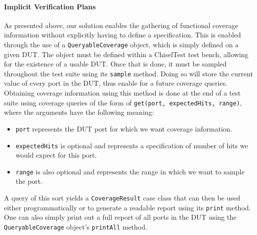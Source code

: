 \documentclass[conference]{IEEEtran}
\begin{document}
\paragraph{Implicit Verification Plans} As presented above, our solution enables the gathering of functional coverage information without explicitly having to define a specification.
This is enabled through the use of a \texttt{QueryableCoverage} object, which is simply defined on a given DUT.
The object must be defined within a ChiselTest test bench, allowing for the existence of a usable DUT.
Once that is done, it must be sampled throughout the test suite using its \texttt{sample} method.
Doing so will store the current value of every port in the DUT, thus enable for a future coverage queries.
Obtaining coverage information using this method is done at the end of a test suite using coverage queries of the form of \texttt{get(port, expectedHits, range)}, where the arguments have the following meaning:
\begin{itemize}
	\item \texttt{port} represents the DUT port for which we want coverage information.
	\item \texttt{expectedHits} is optional and represents a specification of number of hits we would expect for this port.
	\item \texttt{range} is also optional and represents the range in which we want to sample the port.
\end{itemize}
A query of this sort yields a \texttt{CoverageResult} case class that can then be used either programmatically or to generate a readable report using its \texttt{print} method.
One can also simply print out a full report of all ports in the DUT using the \texttt{QueryableCoverage} object's \texttt{printAll} method.
\end{document}
